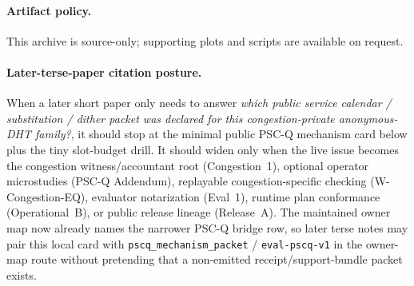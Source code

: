 \documentclass[11pt]{article}
\theoremstyle{definition}
\theoremstyle{remark}
\begin{document}
\paragraph{Artifact policy.}
This archive is source-only; supporting plots and scripts are available on request.\cite{series:artifactpolicy}

\paragraph{Later-terse-paper citation posture.}
When a later short paper only needs to answer \emph{which public service calendar / substitution / dither packet was declared for this congestion-private anonymous-DHT family?}, it should stop at the minimal public PSC-Q mechanism card below plus the tiny slot-budget drill.
It should widen only when the live issue becomes the congestion witness/accountant root (Congestion~1), optional operator microstudies (PSC-Q Addendum), replayable congestion-specific checking (W-Congestion-EQ), evaluator notarization (Eval~1), runtime plan conformance (Operational~B), or public release lineage (Release~A). The maintained owner map now already names the narrower PSC-Q bridge row, so later terse notes may pair this local card with \nolinkurl{pscq\_mechanism\_packet} / \nolinkurl{eval-pscq-v1} in the owner-map route without pretending that a non-emitted receipt/support-bundle packet exists.\cite{series:congeq,series:workedexample,series:seriesspines,series:pscqaddendum,series:wcongeq,series:evalnotary,series:opb,anondht_release_receipts}
\end{document}
